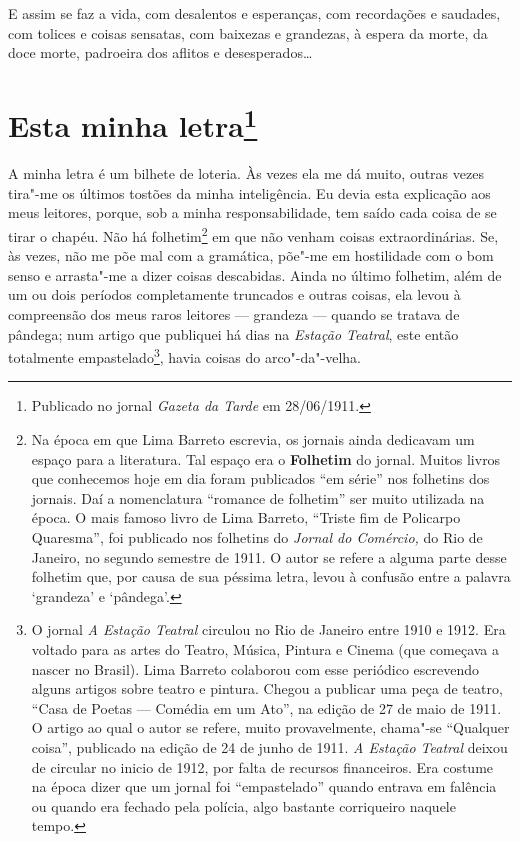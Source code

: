 E assim se faz a vida, com desalentos e esperanças, com recordações e
saudades, com tolices e coisas sensatas, com baixezas e grandezas, à
espera da morte, da doce morte, padroeira dos aflitos e
desesperados\ldots{}



\chapter[Esta minha letra]{Esta minha letra\footnote[*]{Publicado no jornal \emph{Gazeta da Tarde} em 28/06/1911.}}

A minha letra é um bilhete de loteria. Às vezes ela me dá muito, outras
vezes tira"-me os últimos tostões da minha inteligência. Eu devia esta
explicação aos meus leitores, porque, sob a minha responsabilidade, tem
saído cada coisa de se tirar o chapéu. Não há folhetim\footnote{Na época
  em que Lima Barreto escrevia, os jornais ainda dedicavam um espaço
  para a literatura. Tal espaço era o \textbf{Folhetim} do jornal.
  Muitos livros que conhecemos hoje em dia foram publicados ``em série''
  nos folhetins dos jornais. Daí a nomenclatura ``romance de folhetim''
  ser muito utilizada na época. O mais famoso livro de Lima Barreto,
  ``Triste fim de Policarpo Quaresma'', foi publicado nos folhetins do
  \emph{Jornal do Comércio,} do Rio de Janeiro, no segundo semestre de
  1911. O autor se refere a alguma parte desse folhetim que, por causa
  de sua péssima letra, levou à confusão entre a palavra `grandeza' e
  `pândega'.} em que não venham coisas extraordinárias. Se, às vezes,
não me põe mal com a gramática, põe"-me em hostilidade com o bom senso e
arrasta"-me a dizer coisas descabidas. Ainda no último folhetim, além de
um ou dois períodos completamente truncados e outras coisas, ela levou à
compreensão dos meus raros leitores --- grandeza --- quando se tratava
de pândega; num artigo que publiquei há dias na \emph{Estação Teatral},
este então totalmente empastelado\footnote{O jornal \emph{A Estação
  Teatral} circulou no Rio de Janeiro entre 1910 e 1912. Era voltado
  para as artes do Teatro, Música, Pintura e Cinema (que começava a
  nascer no Brasil). Lima Barreto colaborou com esse periódico
  escrevendo alguns artigos sobre teatro e pintura. Chegou a publicar
  uma peça de teatro, ``Casa de Poetas --- Comédia em um Ato'', na edição
  de 27 de maio de 1911. O artigo ao qual o autor se refere, muito
  provavelmente, chama"-se ``Qualquer coisa'', publicado na edição de 24
  de junho de 1911. \emph{A Estação Teatral} deixou de circular no
  inicio de 1912, por falta de recursos financeiros. Era costume na
  época dizer que um jornal foi ``empastelado'' quando entrava em
  falência ou quando era fechado pela polícia, algo bastante corriqueiro
  naquele tempo.}, havia coisas do arco"-da"-velha.


